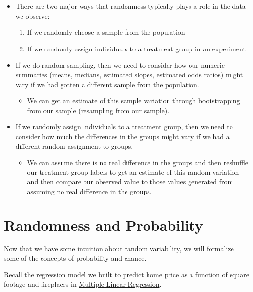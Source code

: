 \documentclass[]{book}
\providecommand{\tightlist}{%
  \setlength{\itemsep}{0pt}\setlength{\parskip}{0pt}}
\begin{document}
\begin{itemize}
\item
  There are two major ways that randomness typically plays a role in the data we observe:

  \begin{enumerate}
  \def\labelenumi{\arabic{enumi}.}
  \tightlist
  \item
    If we randomly choose a sample from the population
  \item
    If we randomly assign individuals to a treatment group in an experiment
  \end{enumerate}
\item
  If we do random sampling, then we need to consider how our numeric summaries (means, medians, estimated slopes, estimated odds ratios) might vary if we had gotten a different sample from the population.

  \begin{itemize}
  \tightlist
  \item
    We can get an estimate of this sample variation through bootstrapping from our sample (resampling from our sample).
  \end{itemize}
\item
  If we randomly assign individuals to a treatment group, then we need to consider how much the differences in the groups might vary if we had a different random assignment to groups.

  \begin{itemize}
  \tightlist
  \item
    We can assume there is no real difference in the groups and then reshuffle our treatment group labels to get an estimate of this random variation and then compare our observed value to those values generated from assuming no real difference in the groups.
  \end{itemize}
\end{itemize}

\hypertarget{randomness-and-probability}{%
\chapter{Randomness and Probability}\label{randomness-and-probability}}

Now that we have some intuition about random variability, we will formalize some of the concepts of probability and chance.

Recall the regression model we built to predict home price as a function of square footage and fireplaces in \protect\hyperlink{multiple-linear-regression}{Multiple Linear Regression}.
\end{document}
